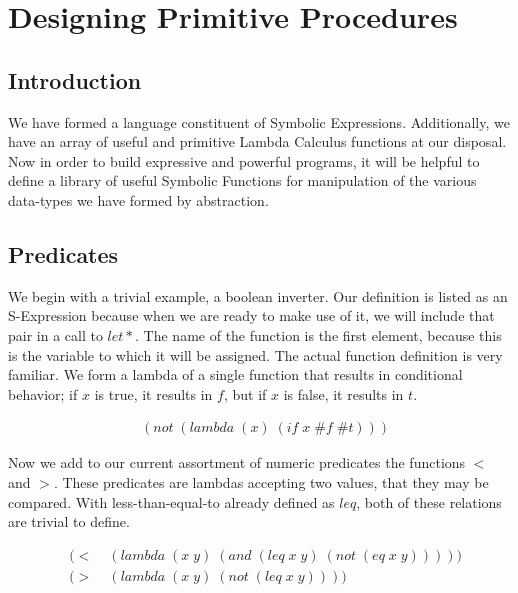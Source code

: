 
\chapter{Designing Primitive Procedures}
\section{Introduction}
We have formed a language constituent of Symbolic Expressions. Additionally, we 
have an array of useful and primitive Lambda Calculus functions at our disposal. 
Now in order to build expressive and powerful programs, it will be helpful to 
define a library of useful Symbolic Functions for manipulation of the various 
data-types we have formed by abstraction.

\section{Predicates}
We begin with a trivial example, a boolean inverter. Our definition is listed as 
an S-Expression because when we are ready to make use of it, we will include that 
pair in a call to $let*$. The name of the function is the first element, because 
this is the variable to which it will be assigned. The actual function definition 
is very familiar. We form a lambda of a single function that results in 
conditional behavior; if $x$ is true, it results in $f$, but if $x$ is false, it 
results in $t$.

\begin{figure}[htp]
\footnotesize
\caption{}\label{fig:notDef}
\begin{align*}
& (not \; (lambda \; (x) \; (if \; x \; \#f \; \#t)))
\end{align*}
\end{figure}

Now we add to our current assortment of numeric predicates the functions $<$ and 
$>$. These predicates are lambdas accepting two values, that they may be compared. 
With less-than-equal-to already defined as $leq$, both of these relations are 
trivial to define.

\begin{figure}[htp]
\footnotesize
\caption{}\label{fig:ltGtDefs}
\begin{align*}
& (< \; &(lambda \; (x \; y) \; (and \; (leq \; x \; y) \; (not \; (eq \; x \; y)))))
\\& (> \; &(lambda \; (x \; y) \; (not \; (leq \; x \; y))))
\end{align*}
\end{figure}

